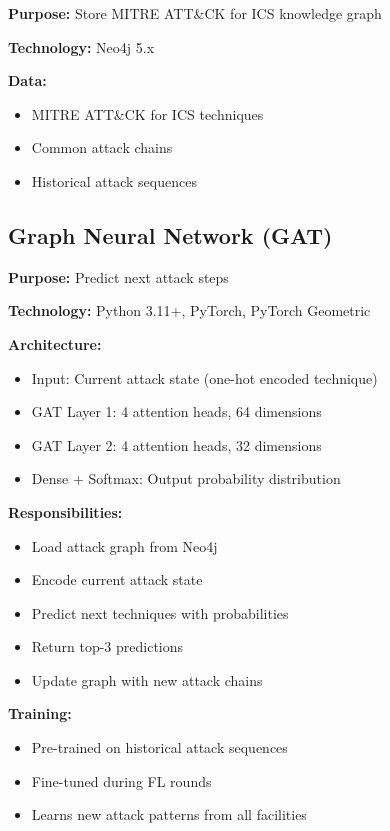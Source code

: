 \documentclass[12pt,a4paper]{article}
\begin{document}
\textbf{Purpose:} Store MITRE ATT\&CK for ICS knowledge graph

\textbf{Technology:} Neo4j 5.x

\textbf{Data:}
\begin{itemize}[leftmargin=1cm,itemsep=0pt]
    \item MITRE ATT\&CK for ICS techniques
    \item Common attack chains
    \item Historical attack sequences
\end{itemize}

\subsection{Graph Neural Network (GAT)}

\textbf{Purpose:} Predict next attack steps

\textbf{Technology:} Python 3.11+, PyTorch, PyTorch Geometric

\textbf{Architecture:}
\begin{itemize}[leftmargin=1cm,itemsep=0pt]
    \item Input: Current attack state (one-hot encoded technique)
    \item GAT Layer 1: 4 attention heads, 64 dimensions
    \item GAT Layer 2: 4 attention heads, 32 dimensions
    \item Dense + Softmax: Output probability distribution
\end{itemize}

\textbf{Responsibilities:}
\begin{itemize}[leftmargin=1cm,itemsep=0pt]
    \item Load attack graph from Neo4j
    \item Encode current attack state
    \item Predict next techniques with probabilities
    \item Return top-3 predictions
    \item Update graph with new attack chains
\end{itemize}

\textbf{Training:}
\begin{itemize}[leftmargin=1cm,itemsep=0pt]
    \item Pre-trained on historical attack sequences
    \item Fine-tuned during FL rounds
    \item Learns new attack patterns from all facilities
\end{itemize}
\end{document}

